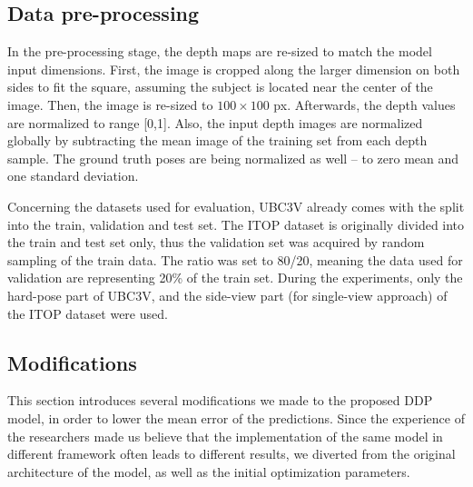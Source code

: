 \subsection{Data pre-processing}

In the pre-processing stage, the depth maps are re-sized to match the model input dimensions. First, the image is cropped along the larger dimension on both sides to fit the square, assuming the subject is located near the center of the image. Then, the image is re-sized to $100\times100$ px. Afterwards, the depth values are normalized to range [0,1]. Also, the input depth images are normalized globally by subtracting the mean image of the training set from each depth sample. The ground truth poses are being normalized as well – to zero mean and one standard deviation.\par
\vspace{5mm}
\noindent 
Concerning the datasets used for evaluation, UBC3V already comes with the split into the train, validation and test set. The ITOP dataset is originally divided into the train and test set only, thus the validation set was acquired by random sampling of the train data. The ratio was set to 80/20, meaning the data used for validation are representing 20\% of the train set. During the experiments, only the hard-pose part of UBC3V, and the side-view part (for single-view approach) of the ITOP dataset were used.

%

\subsection{Modifications}
This section introduces several modifications we made to the proposed DDP model, in order to lower the mean error of the predictions. Since the experience of the researchers made us believe that the implementation of the same model in different framework often leads to different results, we diverted from the original architecture of the model, as well as the initial optimization parameters.\par
\vspace{5mm}


